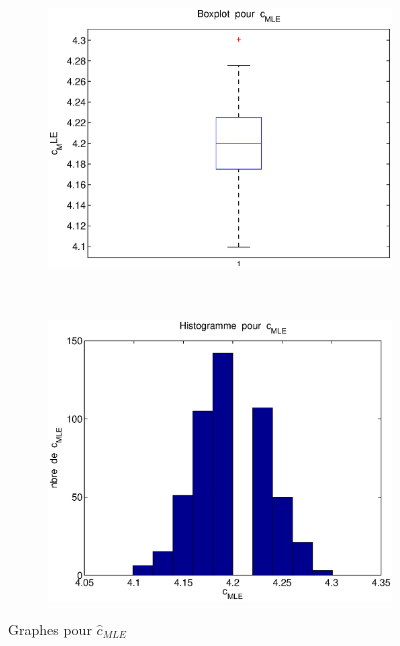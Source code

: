 \begin{figure}[!ht]
        \centering
        \begin{subfigure}[b]{0.4\textwidth}
                \includegraphics[width=\textwidth]{graphes/boxplot_cmle.eps}
        \end{subfigure}%
        ~
        \begin{subfigure}[b]{0.4\textwidth}
                \includegraphics[width=\textwidth]{graphes/hist_cmle.eps}
        \end{subfigure}
        \caption{Graphes pour $\hat{c}_{MLE}$}\label{fig:cmle}
\end{figure}


